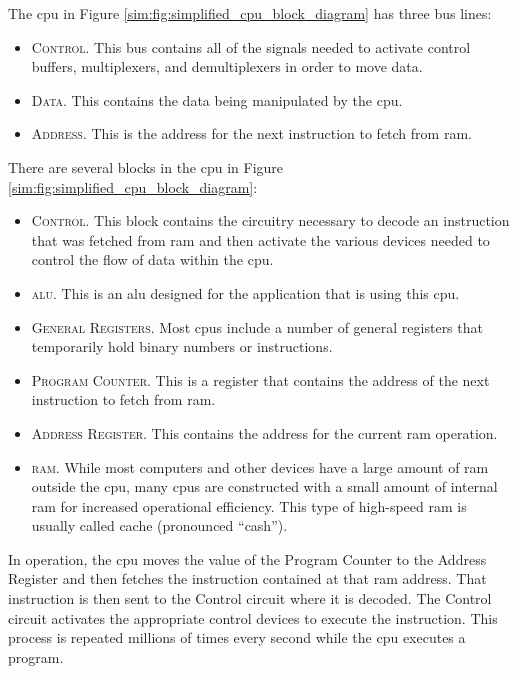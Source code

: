 The \gls{cpu} in Figure \ref{sim:fig:simplified_cpu_block_diagram} has three bus lines: 

\begin{itemize}
  \item \textsc{Control}. This bus contains all of the signals needed to activate control buffers, multiplexers, and demultiplexers in order to move data.
  \item \textsc{Data}. This contains the data being manipulated by the \gls{cpu}.
  \item \textsc{Address}. This is the address for the next instruction to fetch from \gls{ram}.
\end{itemize}

There are several blocks in the \gls{cpu} in Figure \ref{sim:fig:simplified_cpu_block_diagram}:

\begin{itemize}
  \item \textsc{Control}. This block contains the circuitry necessary to decode an instruction that was fetched from \gls{ram} and then activate the various devices needed to control the flow of data within the \gls{cpu}.
  \item \textsc{\gls{alu}}. This is an \gls{alu} designed for the application that is using this \gls{cpu}.
  \item \textsc{General Registers}. Most \glspl{cpu} include a number of general registers that temporarily hold binary numbers or instructions.
  \item \textsc{Program Counter}. This is a register that contains the address of the next instruction to fetch from \gls{ram}.
  \item \textsc{Address Register}. This contains the address for the current \gls{ram} operation.
  \item \textsc{\gls{ram}}. While most computers and other devices have a large amount of \gls{ram} outside the \gls{cpu}, many \glspl{cpu} are constructed with a small amount of internal \gls{ram} for increased operational efficiency. This type of high-speed \gls{ram} is usually called cache (pronounced ``cash'').
\end{itemize}

In operation, the \gls{cpu} moves the value of the Program Counter to the Address Register and then fetches the instruction contained at that \gls{ram} address. That instruction is then sent to the Control circuit where it is decoded. The Control circuit activates the appropriate control devices to execute the instruction. This process is repeated millions of times every second while the \gls{cpu} executes a program.

